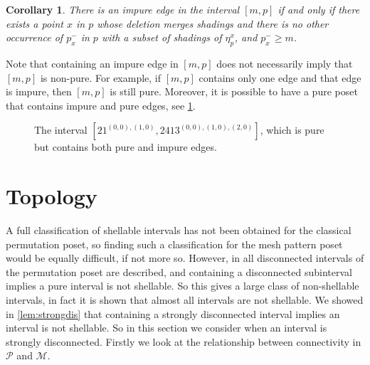 \documentclass[preprint,11pt]{elsarticle}
\newtheorem{cor}[thm]{Corollary}\crefname{cor}{Corollary}{Corollaries}
\newcommand\occX[2]{\eta^{#2}_{#1}}
\newcommand\mX[2]{#1^{-}_{#2}}
\numberwithin{equation}{section}
\numberwithin{figure}{section}
\numberwithin{thm}{section}
\begin{document}
\begin{cor}
There is an impure edge in the interval $[m,p]$ if and only if there exists a
point $x$ in $p$ whose deletion merges shadings and there is no other
occurrence of $\mX{p}{x}$ in $p$ with a subset of shadings of $\occX{p}{x}$, and
$\mX{p}{x}\ge m$.
\end{cor}

Note that containing an impure edge in $[m,p]$ does not necessarily imply
that $[m,p]$ is non-pure. For example, if $[m,p]$ contains only one edge and
that edge is impure, then $[m,p]$ is still pure. Moreover, it is possible
to have a pure poset that contains impure and pure edges, see \cref{fig:pureIm}.

\begin{figure}\centering
{}
\caption{The interval $[21^{(0,0),(1,0)},2413^{(0,0),(1,0),(2,0)}]$,
 which is pure but contains both pure and impure edges.}
 \label{fig:pureIm}
\end{figure}

\section{Topology}\label{sec:topology}
A full classification of shellable intervals has not been obtained for the classical permutation
poset, so finding such a classification for the mesh pattern poset would be equally difficult, if not more so.
However, in \cite{McSt13} all disconnected intervals of the permutation poset are described, and containing a disconnected subinterval
implies a pure interval is not shellable. So this gives a large class of non-shellable intervals, in fact
it is shown that almost all intervals are not shellable. We showed in \cref{lem:strongdis} that containing a strongly
disconnected interval implies an interval is not shellable. So in this section we consider
when an interval is strongly disconnected. Firstly we look at the relationship between connectivity
in $\mathcal{P}$ and $\mathcal{M}$.
\end{document}
